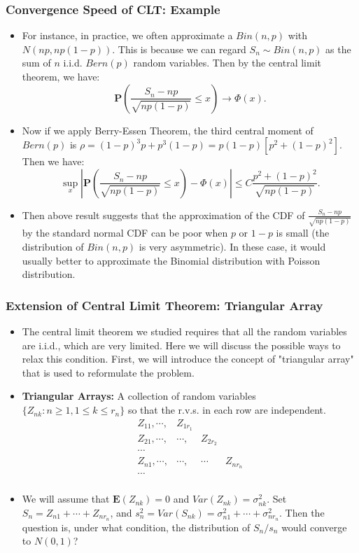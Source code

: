 \documentclass[handout]{beamer}
\newcommand{\BP}{\mathbf{P}}
\newcommand{\BE}{\mathbf{E}}
\begin{document}
 
      \frame
{
  \frametitle{Convergence Speed of CLT: Example}

 \begin{itemize}
 \item<1-> For instance, in practice, we often approximate a $Bin(n,p)$ with $N(np, np(1-p))$. This is because we can regard $S_n\sim Bin(n,p)$ as the sum of $n$ i.i.d. $Bern(p)$ random variables. Then by the central limit theorem, we have: 
 $$\BP(\frac{S_n-np}{\sqrt{np(1-p)}}\leq x)\rightarrow \Phi(x).$$
 
 \item<2-> Now if we apply Berry-Essen Theorem, the third central moment of $Bern(p)$ is $\rho=(1-p)^3p+p^3 (1-p)=p(1-p)[p^2+(1-p)^2]$. Then we have:
 $$\sup_x| \BP(\frac{S_n-np}{\sqrt{np(1-p)}} \leq x)-\Phi(x)| \leq C \frac{p^2+(1-p)^2}{\sqrt{np(1-p)}}.$$

 \item<3->[-] Then above result suggests that the approximation of the CDF of $\frac{S_n-np}{\sqrt{np(1-p)}}$ by the standard normal CDF can be poor when $p$ or $1-p$ is small (the distribution of $Bin(n,p)$ is very asymmetric). In these case, it would usually better to approximate the Binomial distribution with Poisson distribution.  
 
\end{itemize}
 }
 
  
   
  
     \frame
{
  \frametitle{Extension of Central Limit Theorem: Triangular Array}
   \begin{itemize}

\item<1-> The central limit theorem we studied requires that all the random variables are i.i.d., which are very limited. Here we will discuss the possible ways to relax this condition. First, we will introduce the concept of "triangular array" that is used to reformulate the problem. 

\item<2->\textbf{Triangular Arrays:} A collection of random variables $\{Z_{nk}: n\geq 1, 1\leq k \leq r_n\}$ so that the r.v.s. in each row are independent. 
$$\begin{array}{llll}
Z_{11},\cdots, & Z_{1r_1} & \\
Z_{21},\cdots,  & \cdots, &  Z_{2 r_2} \\
\cdots \\
Z_{n1},\cdots,  & \cdots, & \cdots  &  Z_{n r_n} \\
\cdots \\
\end{array}$$
\item<3-> We will assume that $\BE(Z_{nk})=0$ and $Var(Z_{nk}) =\sigma_{nk}^2$. Set $S_n=Z_{n1}+\cdots+Z_{nr_n}$, and $s_n^2=Var(S_{nk})=\sigma^2_{n1}+\cdots+\sigma^2_{nr_n}$. Then the question is, under what condition, the distribution of $S_n/s_n$ would converge to $N(0,1)$? 

\end{itemize}
 }
 
\end{document}
